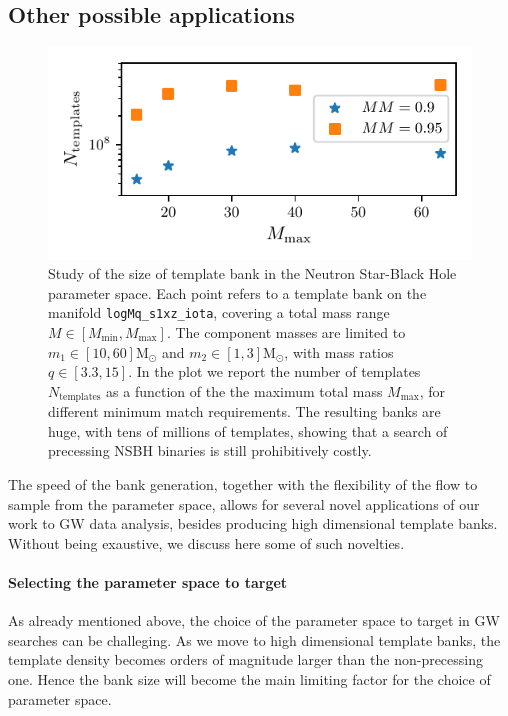 \documentclass[twocolumn,showpacs,preprintnumbers,nofootinbib,prd,
superscriptaddress,10pt]{revtex4-2}
\begin{document}
\subsection{Other possible applications} \label{sec:other_applications}

\begin{figure}[t]
	\centering
	\includegraphics[scale = 1.]{NSBH_size}
	\caption{Study of the size of template bank in the Neutron Star-Black Hole parameter space. Each point refers to a template bank on the manifold \texttt{logMq\_s1xz\_iota}, covering a total mass range $M\in[M_\text{min}, M_\text{max}]$. The component masses are limited to $m_1 \in [10, 60] \mathrm{M_\odot}$ and  $m_2 \in [1, 3] \mathrm{M_\odot}$, with mass ratios $q \in [3.3, 15]$. In the plot we report the number of templates $N_\text{templates}$ as a function of the the maximum total mass $M_\text{max}$, for different minimum match requirements. The resulting banks are huge, with tens of millions of templates, showing that a search of precessing NSBH binaries is still prohibitively costly.}
	\label{fig:NSBH_size}
\end{figure}

The speed of the bank generation, together with the flexibility of the flow to sample from the parameter space, allows for several novel applications of our work to GW data analysis, besides producing high dimensional template banks.
Without being exaustive, we discuss here some of such novelties.


\paragraph{Selecting the parameter space to target}
As already mentioned above, the choice of the parameter space to target in GW searches can be challeging. As we move to high dimensional template banks, the template density becomes orders of magnitude larger than the non-precessing one. Hence the bank size will become the main limiting factor for the choice of parameter space.
\end{document}
